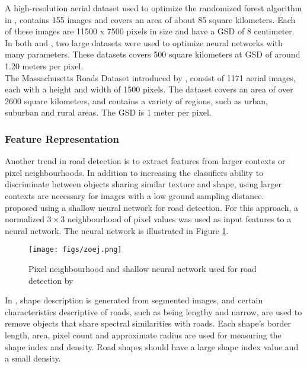 A high-resolution aerial dataset used to optimize the randomized forest algorithm in \citep{Kluckner_semantic_height}, contains  155 images and covers an area of about 85 square kilometers. Each of these images are 11500 x 7500 pixels in size and have a \ac{GSD} of 8 centimeter.\\

In both \citep{Mnih_roads_high_res_aerial_images} and \citep{Mnih_aerial_images_noisy}, two large datasets were used to optimize neural networks with many parameters. These datasets covers 500 square kilometers at \ac{GSD} of around 1.20 meters per pixel.\\

The Massachusetts Roads Dataset introduced by \cite{MnihThesis}, consist of 1171 aerial images, each with a height and width of 1500 pixels. The dataset covers an area of over 2600 square kilometers, and contains a variety of regions, such as urban, suburban and rural areas. The \ac{GSD} is 1 meter per pixel.\\


\subsubsection{Feature Representation}
Another trend in road detection is to extract features from larger contexts or pixel neighbourhoods. In addition to increasing the classifiers ability to discriminate between objects sharing similar texture and shape, using larger contexts are necessary for images with a low ground sampling distance.\\

\cite{Mokhtarzade_road_ann} proposed using a shallow neural network for road detection. For this approach, a normalized $3 \times 3$ neighbourhood of pixel values was used as input features to a neural network. The neural network is illustrated in Figure \ref{fig:zoej_neural_network}. \\

\begin{figure}
\begin{center}
\texttt{[image: figs/zoej.png]}
\caption[shallow neural network]{Pixel neighbourhood and shallow neural network used for road detection by \cite{Mokhtarzade_road_ann} }
\label{fig:zoej_neural_network}
\end{center}
\end{figure}

In \cite{Song_road_extraction_svm}, shape description is generated from segmented images, and certain characteristics descriptive of roads, such as being lengthy and narrow, are used to remove objects that share spectral similarities with roads. Each shape's border length, area, pixel count and approximate radius are used for measuring the shape index and density. Road shapes should have a large shape index value and a small density. \\

